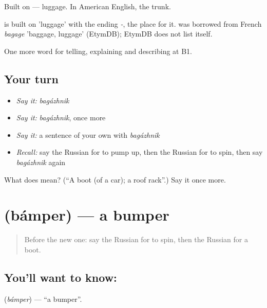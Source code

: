 Built on \emph{} — luggage. In American English, the trunk.

\begin{cousinweb}
\emph{} is built on \emph{} 'luggage' with the ending \emph{-}, the place for it. \emph{} was borrowed from French \emph{bagage} 'baggage, luggage' (EtymDB); EtymDB does not list \emph{} itself.
\end{cousinweb}

\begin{grammarlens}[title={What you've built}]
One more word for telling, explaining and describing at B1.
\end{grammarlens}

\subsection*{Your turn}
\begin{itemize}
\raggedright
  \item \emph{Say it:} \emph{bagázhnik}
  \item \emph{Say it:} \emph{bagázhnik}, once more
  \item \emph{Say it:} a sentence of your own with \emph{bagázhnik}
  \item \emph{Recall:} say the Russian for to pump up, then the Russian for to spin, then say \emph{bagázhnik} again
\end{itemize}

\begin{tcolorbox}[breakable,colback=teal!4,colframe=teal!35!black,title={Before you move on}]
What does  mean? (\textquotedblleft{}A boot (of a car); a roof rack\textquotedblright{}.) Say it once more.
\end{tcolorbox}
\section[\texorpdfstring{\ru{бампер} (bámper)}{бампер (bámper)}]{ (bámper) — a bumper}

\label{lesson:RU-C406-bamper}



\begin{quote}
Before the new one: say the Russian for to spin, then the Russian for a boot.
\end{quote}

\subsection*{You'll want to know: }
\textbf{} (\emph{bámper}) — \textquotedblleft{}a bumper\textquotedblright{}.

